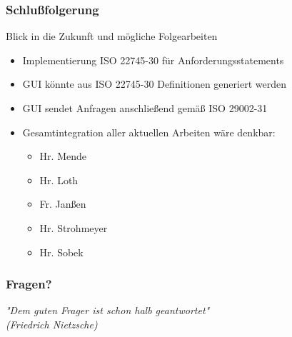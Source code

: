 \documentclass[serif,mathserif]{beamer}
\begin{document}
\begin{frame}
  \frametitle{Schlußfolgerung}
  Blick in die Zukunft und mögliche Folgearbeiten
  \begin{itemize}
	\item Implementierung ISO 22745-30 für Anforderungsstatements
	\item GUI könnte aus ISO 22745-30 Definitionen generiert werden
	\item GUI sendet Anfragen anschließend gemäß ISO 29002-31
	\item Gesamtintegration aller aktuellen Arbeiten wäre denkbar:
	  \begin{itemize}
	  \item Hr. Mende
	  \item Hr. Loth 
	  \item Fr. Janßen
	  \item Hr. Strohmeyer
	  \item Hr. Sobek
	    \end{itemize}  
   \end{itemize}

\end{frame}

\begin{frame}
  \frametitle{Fragen?}
  
\textit{ "Dem guten Frager ist schon halb geantwortet"}\\
\textit{ (Friedrich Nietzsche)}

\end{frame}
\end{document}
